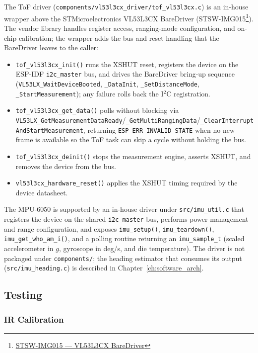 The ToF driver (\texttt{components/vl53l3cx\_driver/tof\_vl53l3cx.c}) is an in-house wrapper above the STMicroelectronics VL53L3CX BareDriver (STSW-IMG015\footnote{\href{https://www.st.com/en/embedded-software/stsw-img015.html}{STSW-IMG015 — VL53L3CX BareDriver}}). The vendor library handles register access, ranging-mode configuration, and on-chip calibration; the wrapper adds the bus and reset handling that the BareDriver leaves to the caller:
\begin{itemize}
    \item \texttt{tof\_vl53l3cx\_init()} runs the XSHUT reset, registers the device on the ESP-IDF \texttt{i2c\_master} bus, and drives the BareDriver bring-up sequence (\texttt{VL53LX\_WaitDeviceBooted}, \texttt{\_DataInit}, \texttt{\_SetDistanceMode}, \texttt{\_StartMeasurement}); any failure rolls back the I$^2$C registration.
    \item \texttt{tof\_vl53l3cx\_get\_data()} polls without blocking via \texttt{VL53LX\_GetMeasurementDataReady}/\texttt{\_GetMultiRangingData}/\texttt{\_ClearInterruptAndStartMeasurement}, returning \texttt{ESP\_ERR\_INVALID\_STATE} when no new frame is available so the ToF task can skip a cycle without holding the bus.
    \item \texttt{tof\_vl53l3cx\_deinit()} stops the measurement engine, asserts XSHUT, and removes the device from the bus.
    \item \texttt{vl53l3cx\_hardware\_reset()} applies the XSHUT timing required by the device datasheet.
\end{itemize}

The MPU-6050 is supported by an in-house driver under \texttt{src/imu\_util.c} that registers the device on the shared \texttt{i2c\_master} bus, performs power-management and range configuration, and exposes \texttt{imu\_setup()}, \texttt{imu\_teardown()}, \texttt{imu\_get\_who\_am\_i()}, and a polling routine returning an \texttt{imu\_sample\_t} (scaled accelerometer in $g$, gyroscope in deg/s, and die temperature). The driver is not packaged under \texttt{components/}; the heading estimator that consumes its output (\texttt{src/imu\_heading.c}) is described in Chapter~\ref{ch:software_arch}.

\subsection{Testing}

\subsubsection{IR Calibration}
\label{sec:ir_calibration}

